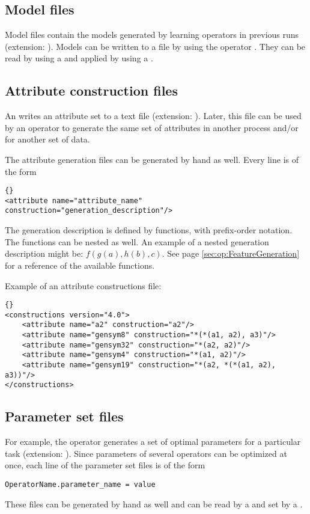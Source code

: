 {\subsection{Model files}
Model files contain the models generated by learning operators in 
previous \rapidminer runs (extension: ). Models can be written to a file by using the operator
. They can be read by using a  and applied
by using a .



\subsection{Attribute construction files}
\label{sec:attributegenerationfiles}
An  writes an attribute set to a text file
(extension: ). 
Later, this file can be used by an  operator
to generate the same set of attributes in another process and/or
for another set of data.

The attribute generation files can be generated by hand as well. Every
line is of the form
 
\begin{lstlisting}[style=rapidminerxmlstyle]{}
<attribute name="attribute_name" construction="generation_description"/>
\end{lstlisting}

The generation description is defined by functions, with prefix-order
notation. The functions can be nested as well. An example
of a nested generation description might be: $f(g(a), h(b), c)$. See
page \ref{sec:op:FeatureGeneration} for a reference of the available
functions.

Example of an attribute constructions file:

\begin{lstlisting}[style=rapidminerxmlstyle]{}
<constructions version="4.0">
    <attribute name="a2" construction="a2"/>
    <attribute name="gensym8" construction="*(*(a1, a2), a3)"/>
    <attribute name="gensym32" construction="*(a2, a2)"/>
    <attribute name="gensym4" construction="*(a1, a2)"/>
    <attribute name="gensym19" construction="*(a2, *(*(a1, a2), a3))"/>
</constructions>
\end{lstlisting}




\subsection{Parameter set files}
\label{sec:parameter_set_files}
For example, the  operator generates a set of optimal
parameters for a particular task (extension: ). Since parameters of several
operators can be optimized at once, each line of the parameter set
files is of the form
\begin{verbatim}
OperatorName.parameter_name = value
\end{verbatim}
These files can be generated by hand as well and can be read by a
 and set by a .


}
